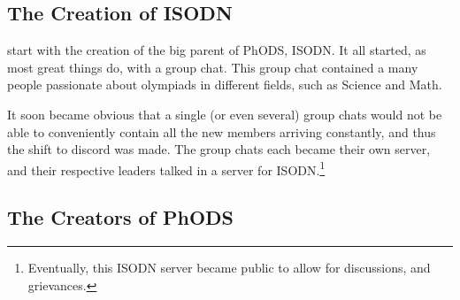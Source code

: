 \subsection{The Creation of ISODN}
 start with the creation of the big parent of PhODS, ISODN. It all started, as most great things do, with a group chat. This group chat contained a many people passionate about olympiads in different fields, such as Science and Math.

It soon became obvious that a single (or even several) group chats would not be able to conveniently contain all the new members arriving constantly, and thus the shift to discord was made. The group chats each became their own server, and their respective leaders talked in a server for ISODN.\footnote{Eventually, this ISODN server became public to allow for discussions, and grievances.}

\subsection{The Creators of PhODS}